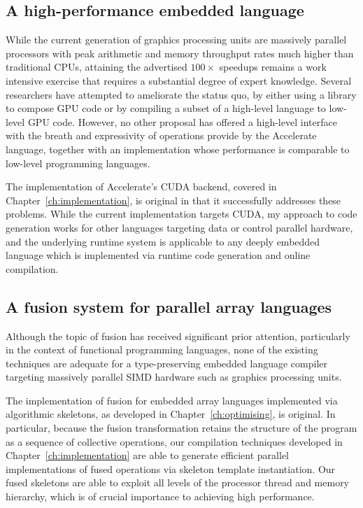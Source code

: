 \subsection{A high-performance embedded language}

While the current generation of graphics processing units are massively parallel
processors with peak arithmetic and memory throughput rates much higher than
traditional CPUs, attaining the advertised $100\times$ speedups remains a work
intensive exercise that requires a substantial degree of expert knowledge.
Several researchers have attempted to ameliorate the status quo, by either using
a library to compose GPU code or by compiling a subset of a high-level language
to low-level GPU code. However, no other proposal has offered a high-level
interface with the breath and expressivity of operations provide by the
Accelerate language, together with an implementation whose performance is
comparable to low-level programming languages.


The implementation of Accelerate's CUDA backend, covered in
Chapter~\ref{ch:implementation}, is original in that it successfully addresses
these problems. While the current implementation targets CUDA, my approach to
code generation works for other languages targeting data or control parallel
hardware, and the underlying runtime system is applicable to any deeply embedded
language which is implemented via runtime code generation and online
compilation.


\subsection{A fusion system for parallel array languages}

Although the topic of fusion has received significant prior attention,
particularly in the context of functional programming languages, none of the
existing techniques are adequate for a type-preserving embedded language
compiler targeting massively parallel SIMD hardware such as graphics processing
units.

The implementation of fusion for embedded array languages implemented via
algorithmic skeletons, as developed in Chapter~\ref{ch:optimising}, is original.
In particular, because the fusion transformation retains the structure of the
program as a sequence of collective operations, our compilation techniques
developed in Chapter~\ref{ch:implementation} are able to generate efficient
parallel implementations of fused operations via skeleton template
instantiation. Our fused skeletons are able to exploit all levels of the
processor thread and memory hierarchy, which is of crucial importance to
achieving high performance.


